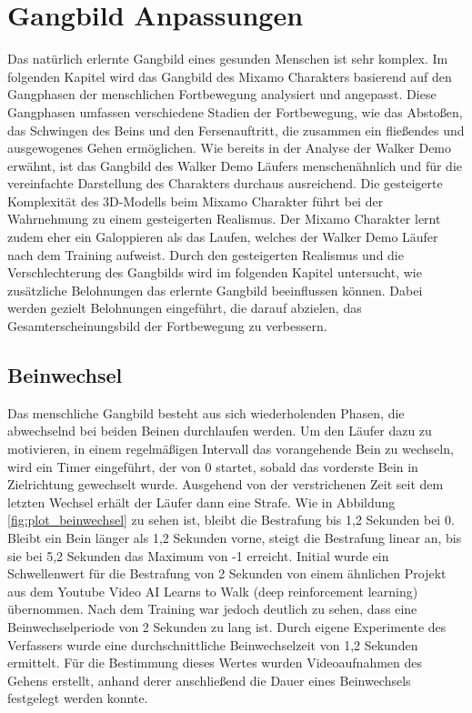 \section{Gangbild Anpassungen}
Das natürlich erlernte Gangbild eines gesunden Menschen ist sehr komplex. Im folgenden Kapitel wird das Gangbild des Mixamo Charakters basierend auf den Gangphasen der menschlichen Fortbewegung analysiert und angepasst. Diese Gangphasen umfassen verschiedene Stadien der Fortbewegung, wie das Abstoßen, das Schwingen des Beins und den Fersenauftritt, die zusammen ein fließendes und ausgewogenes Gehen ermöglichen. Wie bereits in der Analyse der Walker Demo erwähnt, ist das Gangbild des Walker Demo Läufers menschenähnlich und für die vereinfachte Darstellung des Charakters durchaus ausreichend. Die gesteigerte Komplexität des 3D-Modells beim Mixamo Charakter führt bei der Wahrnehmung zu einem gesteigerten Realismus. Der Mixamo Charakter lernt zudem eher ein Galoppieren als das Laufen, welches der Walker Demo Läufer nach dem Training aufweist. Durch den gesteigerten Realismus und die Verschlechterung des Gangbilds wird im folgenden Kapitel untersucht, wie zusätzliche Belohnungen das erlernte Gangbild beeinflussen können. Dabei werden gezielt Belohnungen eingeführt, die darauf abzielen, das Gesamterscheinungsbild der Fortbewegung zu verbessern.

\subsection{Beinwechsel}
Das menschliche Gangbild besteht aus sich wiederholenden Phasen, die abwechselnd bei beiden Beinen durchlaufen werden. Um den Läufer dazu zu motivieren, in einem regelmäßigen Intervall das vorangehende Bein zu wechseln, wird ein Timer eingeführt, der von 0 startet, sobald das vorderste Bein in Zielrichtung gewechselt wurde. Ausgehend von der verstrichenen Zeit seit dem letzten Wechsel erhält der Läufer dann eine Strafe. Wie in Abbildung \ref{fig:plot_beinwechsel} zu sehen ist, bleibt die Bestrafung bis 1,2 Sekunden bei 0. Bleibt ein Bein länger als 1,2 Sekunden vorne, steigt die Bestrafung linear an, bis sie bei 5,2 Sekunden das Maximum von -1 erreicht. Initial wurde ein Schwellenwert für die Bestrafung von 2 Sekunden von einem ähnlichen Projekt aus dem Youtube Video \grqq{}AI Learns to Walk (deep reinforcement learning)\grqq{} übernommen.\cite{aiwarehouse} Nach dem Training war jedoch deutlich zu sehen, dass eine Beinwechselperiode von 2 Sekunden zu lang ist. Durch eigene Experimente des Verfassers wurde eine durchschnittliche Beinwechselzeit von 1,2 Sekunden ermittelt. Für die Bestimmung dieses Wertes wurden Videoaufnahmen des Gehens erstellt, anhand derer anschließend die Dauer eines Beinwechsels festgelegt werden konnte.

